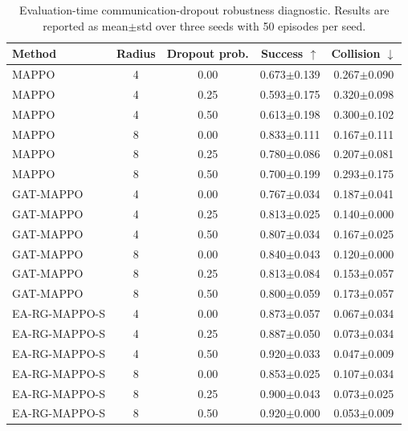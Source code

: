 \begin{table}[t]
\centering
\caption{Evaluation-time communication-dropout robustness diagnostic. Results are reported as mean$\pm$std over three seeds with 50 episodes per seed.}
\label{tab:comm_dropout_robustness}
\begin{tabular}{lcccc}
\toprule
Method & Radius & Dropout prob. & Success $\uparrow$ & Collision $\downarrow$ \\
\midrule
MAPPO & 4 & 0.00 & 0.673$\pm$0.139 & 0.267$\pm$0.090 \\
MAPPO & 4 & 0.25 & 0.593$\pm$0.175 & 0.320$\pm$0.098 \\
MAPPO & 4 & 0.50 & 0.613$\pm$0.198 & 0.300$\pm$0.102 \\
MAPPO & 8 & 0.00 & 0.833$\pm$0.111 & 0.167$\pm$0.111 \\
MAPPO & 8 & 0.25 & 0.780$\pm$0.086 & 0.207$\pm$0.081 \\
MAPPO & 8 & 0.50 & 0.700$\pm$0.199 & 0.293$\pm$0.175 \\
\midrule
GAT-MAPPO & 4 & 0.00 & 0.767$\pm$0.034 & 0.187$\pm$0.041 \\
GAT-MAPPO & 4 & 0.25 & 0.813$\pm$0.025 & 0.140$\pm$0.000 \\
GAT-MAPPO & 4 & 0.50 & 0.807$\pm$0.034 & 0.167$\pm$0.025 \\
GAT-MAPPO & 8 & 0.00 & 0.840$\pm$0.043 & 0.120$\pm$0.000 \\
GAT-MAPPO & 8 & 0.25 & 0.813$\pm$0.084 & 0.153$\pm$0.057 \\
GAT-MAPPO & 8 & 0.50 & 0.800$\pm$0.059 & 0.173$\pm$0.057 \\
\midrule
EA-RG-MAPPO-S & 4 & 0.00 & 0.873$\pm$0.057 & 0.067$\pm$0.034 \\
EA-RG-MAPPO-S & 4 & 0.25 & 0.887$\pm$0.050 & 0.073$\pm$0.034 \\
EA-RG-MAPPO-S & 4 & 0.50 & 0.920$\pm$0.033 & 0.047$\pm$0.009 \\
EA-RG-MAPPO-S & 8 & 0.00 & 0.853$\pm$0.025 & 0.107$\pm$0.034 \\
EA-RG-MAPPO-S & 8 & 0.25 & 0.900$\pm$0.043 & 0.073$\pm$0.025 \\
EA-RG-MAPPO-S & 8 & 0.50 & 0.920$\pm$0.000 & 0.053$\pm$0.009 \\
\bottomrule
\end{tabular}
\end{table}
